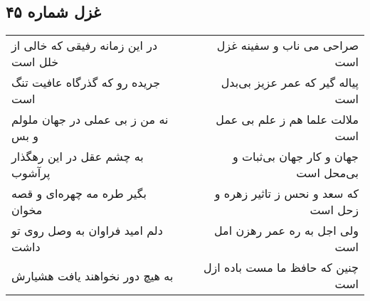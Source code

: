 \begin{center}
\section*{غزل شماره ۴۵}
\label{sec:sh045}
\begin{longtable}{l p{0.5cm} r}
در این زمانه رفیقی که خالی از خلل است
&&
صراحی می ناب و سفینه غزل است
\\
جریده رو که گذرگاه عافیت تنگ است
&&
پیاله گیر که عمر عزیز بی‌بدل است
\\
نه من ز بی عملی در جهان ملولم و بس
&&
ملالت علما هم ز علم بی عمل است
\\
به چشم عقل در این رهگذار پرآشوب
&&
جهان و کار جهان بی‌ثبات و بی‌محل است
\\
بگیر طره مه چهره‌ای و قصه مخوان
&&
که سعد و نحس ز تاثیر زهره و زحل است
\\
دلم امید فراوان به وصل روی تو داشت
&&
ولی اجل به ره عمر رهزن امل است
\\
به هیچ دور نخواهند یافت هشیارش
&&
چنین که حافظ ما مست باده ازل است
\\
\end{longtable}
\end{center}
